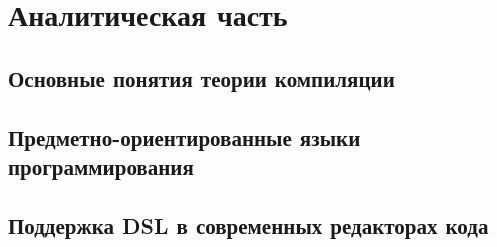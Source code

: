 \chapter{Аналитическая часть} \label{chapt1}

\section{Основные понятия теории компиляции} \label{sec11} 



 






\section{Предметно-ориентированные языки программирования} \label{sec12}



\section{Поддержка DSL в современных редакторах кода} \label{sec13}


